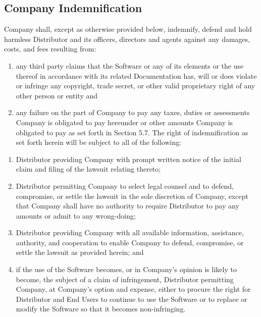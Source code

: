 \documentclass[letterpaper,10pt,openany,oneside,english]{sphinxmanual}
\begin{document}
\subsection{Company Indemnification}
\label{\detokenize{indemnification:company-indemnification}}
Company shall, except as otherwise provided below, indemnify, defend and hold harmless Distributor and its officers, directors and agents against any damages, costs, and fees resulting from:
\begin{enumerate}
\item {} 
any third party claims that the Software or any of its elements or the use thereof in accordance with its related Documentation has, will or does violate or infringe any copyright, trade secret, or other valid  proprietary right of any other person or entity and

\item {} 
any failure on the part of Company to pay any taxes, duties or assessments Company is obligated to pay hereunder or other amounts Company is obligated to pay as set forth in Section 5.7. The right of indemnification as set forth herein will be subject to all of the following:

\end{enumerate}
\begin{enumerate}
\item {} 
Distributor providing Company with prompt written notice of the initial claim and filing of the lawsuit relating thereto;

\item {} 
Distributor permitting Company to select legal counsel and to defend, compromise, or settle the lawsuit in the sole discretion of Company, except that Company shall have no authority to require Distributor to pay any amounts or admit to any wrong-doing;

\item {} 
Distributor providing Company with all available information, assistance, authority, and cooperation to enable Company to defend, compromise, or settle the lawsuit as provided herein; and

\item {} 
if the use of the Software becomes, or in Company’s opinion is likely to become, the subject of a claim of infringement, Distributor permitting Company, at Company’s option and expense, either to procure the right for Distributor and End Users to continue to use the Software or to replace or modify the Software so that it becomes non-infringing.

\end{enumerate}
\end{document}
